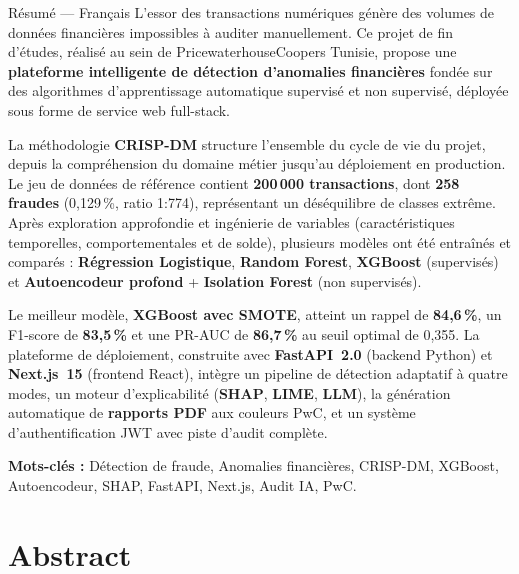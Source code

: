 \documentclass[12pt,a4paper,twoside]{report}
\theoremstyle{definition}
\begin{document}
\begin{pwcbox}{Résumé — Français}
L'essor des transactions numériques génère des volumes de données financières
impossibles à auditer manuellement. Ce projet de fin d'études, réalisé au sein
de PricewaterhouseCoopers Tunisie, propose une \textbf{plateforme intelligente de
détection d'anomalies financières} fondée sur des algorithmes d'apprentissage
automatique supervisé et non supervisé, déployée sous forme de service web
full-stack.

La méthodologie \textbf{CRISP-DM} structure l'ensemble du cycle de vie du projet,
depuis la compréhension du domaine métier jusqu'au déploiement en production.
Le jeu de données de référence contient \textbf{200\,000 transactions}, dont
\textbf{258 fraudes} (0,129\,\%, ratio 1:774), représentant un déséquilibre de
classes extrême. Après exploration approfondie et ingénierie de variables
(caractéristiques temporelles, comportementales et de solde), plusieurs modèles
ont été entraînés et comparés : \textbf{Régression Logistique},
\textbf{Random Forest}, \textbf{XGBoost} (supervisés) et
\textbf{Autoencodeur profond} + \textbf{Isolation Forest} (non supervisés).

Le meilleur modèle, \textbf{XGBoost avec SMOTE}, atteint un rappel de
\textbf{84,6\,\%}, un F1-score de \textbf{83,5\,\%} et une PR-AUC de
\textbf{86,7\,\%} au seuil optimal de 0,355. La plateforme de déploiement,
construite avec \textbf{FastAPI~2.0} (backend Python) et \textbf{Next.js~15}
(frontend React), intègre un pipeline de détection adaptatif à quatre modes,
un moteur d'explicabilité (\textbf{SHAP}, \textbf{LIME}, \textbf{LLM}),
la génération automatique de \textbf{rapports PDF} aux couleurs PwC, et un
système d'authentification JWT avec piste d'audit complète.

\textbf{Mots-clés :} Détection de fraude, Anomalies financières, CRISP-DM,
XGBoost, Autoencodeur, SHAP, FastAPI, Next.js, Audit IA, PwC.
\end{pwcbox}

\chapter*{Abstract}
\end{document}
